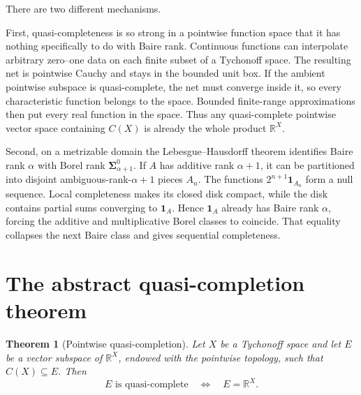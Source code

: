 \documentclass[11pt]{article}
\newtheorem{theorem}{Theorem}
\newcommand{\R}{\mathbb{R}}
\begin{document}
There are two different mechanisms.

First, quasi-completeness is so strong in a pointwise function space that it
has nothing specifically to do with Baire rank.  Continuous functions can
interpolate arbitrary zero--one data on each finite subset of a Tychonoff
space.  The resulting net is pointwise Cauchy and stays in the bounded unit
box.  If the ambient pointwise subspace is quasi-complete, the net must
converge inside it, so every characteristic function belongs to the space.
Bounded finite-range approximations then put every real function in the
space.  Thus any quasi-complete pointwise vector space containing $C(X)$ is
already the whole product $\R^X$.

Second, on a metrizable domain the Lebesgue--Hausdorff theorem identifies
Baire rank $\alpha$ with Borel rank $\boldsymbol\Sigma^0_{\alpha+1}$.
If $A$ has additive rank $\alpha+1$, it can be partitioned into disjoint
ambiguous-rank-$\alpha+1$ pieces $A_n$.  The functions
$2^{n+1}\mathbf 1_{A_n}$ form a null sequence.  Local completeness makes
its closed disk compact, while the disk contains partial sums converging to
$\mathbf 1_A$.  Hence $\mathbf 1_A$ already has Baire rank $\alpha$, forcing
the additive and multiplicative Borel classes to coincide.  That equality
collapses the next Baire class and gives sequential completeness.

\section{The abstract quasi-completion theorem}

\begin{theorem}[Pointwise quasi-completion]\label{thm:abstract}
Let $X$ be a Tychonoff space and let $E$ be a vector subspace of $\R^X$,
endowed with the pointwise topology, such that $C(X)\subseteq E$.  Then
\[
                 E\text{ is quasi-complete}
                 \quad\Longleftrightarrow\quad E=\R^X.
\]
\end{theorem}
\end{document}
